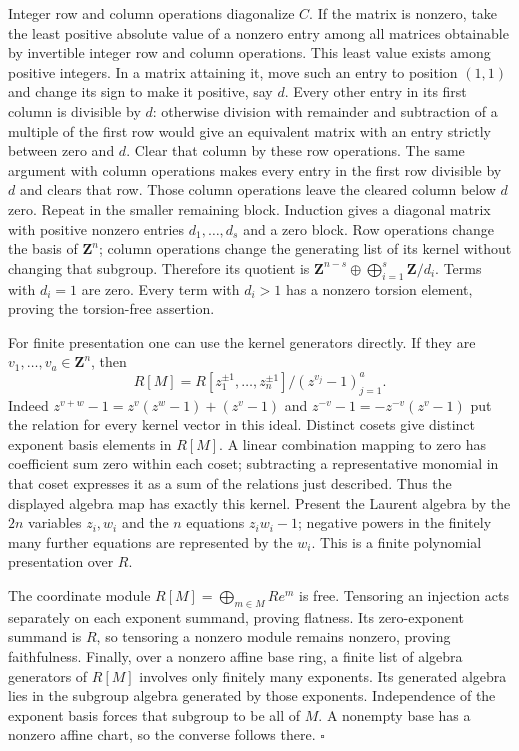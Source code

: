 \documentclass[11pt,a4paper,openany]{report}
\newcounter{none}
\begin{document}
Integer row and column operations diagonalize \(C\). If the matrix is nonzero, take the least positive absolute value of a nonzero entry among all matrices obtainable by invertible integer row and column operations. This least value exists among positive integers. In a matrix attaining it, move such an entry to position \((1,1)\) and change its sign to make it positive, say \(d\). Every other entry in its first column is divisible by \(d\): otherwise division with remainder and subtraction of a multiple of the first row would give an equivalent matrix with an entry strictly between zero and \(d\). Clear that column by these row operations. The same argument with column operations makes every entry in the first row divisible by \(d\) and clears that row. Those column operations leave the cleared column below \(d\) zero. Repeat in the smaller remaining block. Induction gives a diagonal matrix with positive nonzero entries \(d_1,\ldots,d_s\) and a zero block. Row operations change the basis of \(\mathbf Z^n\); column operations change the generating list of its kernel without changing that subgroup. Therefore its quotient is \(\mathbf Z^{n-s}\oplus\bigoplus_{i=1}^s\mathbf Z/d_i\). Terms with \(d_i=1\) are zero. Every term with \(d_i>1\) has a nonzero torsion element, proving the torsion-free assertion.

For finite presentation one can use the kernel generators directly. If they are \(v_1,\ldots,v_a\in\mathbf Z^n\), then \[
R[M]=R[z_1^{\pm1},\ldots,z_n^{\pm1}]/(z^{v_j}-1)_{j=1}^a.
\] Indeed \(z^{v+w}-1=z^v(z^w-1)+(z^v-1)\) and \(z^{-v}-1=-z^{-v}(z^v-1)\) put the relation for every kernel vector in this ideal. Distinct cosets give distinct exponent basis elements in \(R[M]\). A linear combination mapping to zero has coefficient sum zero within each coset; subtracting a representative monomial in that coset expresses it as a sum of the relations just described. Thus the displayed algebra map has exactly this kernel. Present the Laurent algebra by the \(2n\) variables \(z_i,w_i\) and the \(n\) equations \(z_iw_i-1\); negative powers in the finitely many further equations are represented by the \(w_i\). This is a finite polynomial presentation over \(R\).

The coordinate module \(R[M]=\bigoplus_{m\in M}R e^m\) is free. Tensoring an injection acts separately on each exponent summand, proving flatness. Its zero-exponent summand is \(R\), so tensoring a nonzero module remains nonzero, proving faithfulness. Finally, over a nonzero affine base ring, a finite list of algebra generators of \(R[M]\) involves only finitely many exponents. Its generated algebra lies in the subgroup algebra generated by those exponents. Independence of the exponent basis forces that subgroup to be all of \(M\). A nonempty base has a nonzero affine chart, so the converse follows there. \(\square\)
\end{document}
